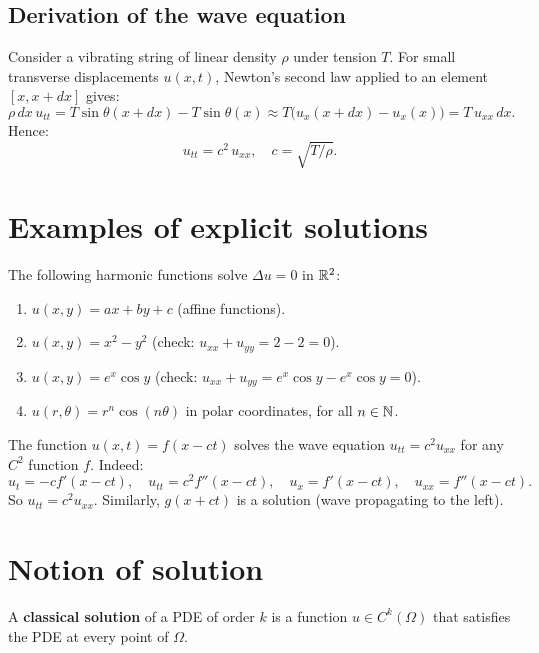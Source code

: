 \subsection{Derivation of the wave equation}

Consider a vibrating string of linear density $\rho$ under tension $T$.
For small transverse displacements $u(x,t)$, Newton's second law applied
to an element $[x, x+dx]$ gives:
\[
    \rho\, dx\, u_{tt} = T\sin\theta(x+dx) - T\sin\theta(x)
    \approx T\bigl(u_x(x+dx) - u_x(x)\bigr) = T\, u_{xx}\, dx.
\]
Hence:
\begin{equation}\label{eq:wave_derivation}
    u_{tt} = c^2\, u_{xx}, \quad c = \sqrt{T/\rho}.
\end{equation}

\section{Examples of explicit solutions}

\begin{example}
The following harmonic functions solve $\Delta u = 0$ in $\mathbb{R}^2$:
\begin{enumerate}
    \item $u(x,y) = ax + by + c$ (affine functions).
    \item $u(x,y) = x^2 - y^2$ (check: $u_{xx} + u_{yy} = 2 - 2 = 0$).
    \item $u(x,y) = e^x \cos y$ (check: $u_{xx} + u_{yy} = e^x\cos y - e^x\cos y = 0$).
    \item $u(r,\theta) = r^n \cos(n\theta)$ in polar coordinates, for all $n \in \mathbb{N}$.
\end{enumerate}
\end{example}

\begin{example}
The function $u(x,t) = f(x - ct)$ solves the wave equation
$u_{tt} = c^2 u_{xx}$ for any $C^2$ function $f$. Indeed:
\[
    u_t = -c f'(x-ct), \quad u_{tt} = c^2 f''(x-ct), \quad
    u_x = f'(x-ct), \quad u_{xx} = f''(x-ct).
\]
So $u_{tt} = c^2 u_{xx}$. Similarly, $g(x+ct)$ is a solution (wave
propagating to the left).
\end{example}

\section{Notion of solution}

\begin{definition}
A \textbf{classical solution} of a PDE of order $k$ is a function
$u \in C^k(\Omega)$ that satisfies the PDE at every point of $\Omega$.
\end{definition}

